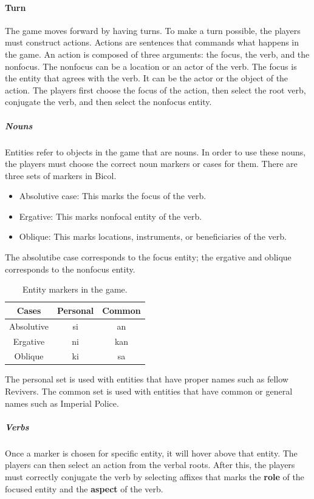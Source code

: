 \documentclass[11pt]{article}
\begin{document}
\paragraph{Turn}
The game moves forward by having turns. To make a turn possible, the players must construct actions. Actions are sentences that commands what happens in the game. An action is composed of three arguments: the focus, the verb, and the nonfocus. The nonfocus can be a location or an actor of the verb. The focus is the entity that agrees with the verb. It can be the actor or the object of the action. The players first choose the focus of the action, then select the root verb, conjugate the verb, and then select the nonfocus entity.
\subparagraph{Nouns}
Entities refer to objects in the game that are nouns. In order to use these nouns, the players must choose the correct noun markers or cases for them. There are three sets of markers in Bicol. \\
\begin{itemize}
\item Absolutive case: This marks the focus of the verb.
\item Ergative: This marks nonfocal entity of the verb.
\item Oblique: This marks locations, instruments, or beneficiaries of the verb.
\end{itemize}
The absolutibe case corresponds to the focus entity; the ergative and oblique corresponds to the nonfocus entity.
\begin{table}[H]
  \centering
  \begin{tabular}{|c|c|c|}
    \hline
    Cases & Personal & Common \\ \hline
    Absolutive & si & an \\ \hline
    Ergative & ni & kan \\ \hline
    Oblique & ki & sa \\ \hline
  \end{tabular}
  \caption{Entity markers in the game.}
  \label{tab:markers}
\end{table}
The personal set is used with entities that have proper names such as fellow Revivers. The common set is used with entities that have common or general names such as Imperial Police.
    
\subparagraph{Verbs}
Once a marker is chosen for specific entity, it will hover above that entity. The players can then select an action from the verbal roots. After this, the players must correctly conjugate the verb by selecting affixes that marks the \textbf{role} of the focused entity and the \textbf{aspect} of the verb.
\end{document}
